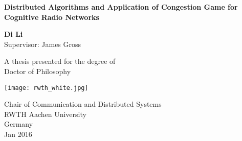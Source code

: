 


\begin{titlepage}
    \begin{center}
        \vspace*{1cm}
        
        \Huge
        \textbf{Distributed Algorithms and Application of Congestion Game for Cognitive Radio Networks}
        
        
        \vspace{1.5cm}
        
        \textbf{Di Li}\\
        \vspace{.5cm}
        \LARGE
        Supervisor: James Gross
        
        \vfill
        
        A thesis presented for the degree of\\
        Doctor of Philosophy
        
        \vspace{0.8cm}
        
        \texttt{[image: rwth\_white.jpg]}
        
        \Large
        Chair of Communication and Distributed Systems\\
        RWTH Aachen University\\
        Germany\\
        Jan 2016
        \vspace{1.5cm}
        
    \end{center}
\end{titlepage}